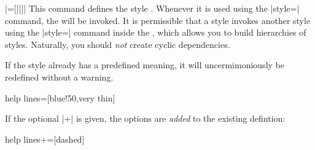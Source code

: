 \begin{command}{\tikzstyle{}\opt{|+|}|=[||]|}
  This command defines the style . Whenever it is
  used using the |style=| command, the 
  will be invoked. It is permissible that a style invokes another
  style using the |style=| command inside the , which
  allows you to build hierarchies of styles. Naturally, you should
  \emph{not} create cyclic dependencies.

  If the style already has a predefined meaning, it will
  uncermimoniously be redefined without a warning.
\begin{codeexample}[]
\tikzstyle help lines=[blue!50,very thin]
\end{codeexample}

  If the optional |+| is given, the options are \emph{added} to the
  existing defintion:
\begin{codeexample}[]
\tikzstyle help lines+=[dashed] %
\end{codeexample}
\end{command}
